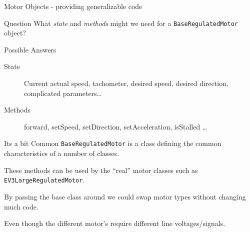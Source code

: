 \documentclass[color=pdftex,usenames,dvipsnames, aspectratio=169]{beamer}
\begin{document}
\begin{frame}[label=objects]{Motor Objects - providing generalizable code}
\begin{alertblock}{Question}
What \emph{state} and \emph{methods} might we need for a \lstinline!BaseRegulatedMotor! object?
\end{alertblock}

\begin{alertblock}{Possible Answers}
\begin{description}
\item[State] Current actual speed, tachometer, desired speed, desired direction, complicated parameters\ldots
\item[Methods] forward, setSpeed, setDirection, setAcceleration, isStalled \ldots
\end{description}
\end{alertblock}
\begin{block}{Its a bit Common}
\small 
\lstinline!BaseRegulatedMotor! is a class defining the \alert{common characteristics of a number of classes}.

These methods can be used by the ``real'' motor classes such as \alert{\lstinline!EV3LargeRegulatedMotor!}.

By passing the base class around we could swap motor types without changing much code.

Even though the different motor's require different line voltages/signals.
\end{block}

\end{frame}
\end{document}
